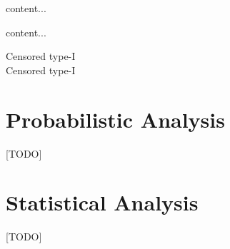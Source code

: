 \begin{definition}
content...
\end{definition}



\begin{definition}
content...
\end{definition}





\begin{description}
\item [Censored type-I]
\item [Censored type-I]
\end{description}






\section{Probabilistic Analysis}
[TODO]




\section{Statistical Analysis}
[TODO]